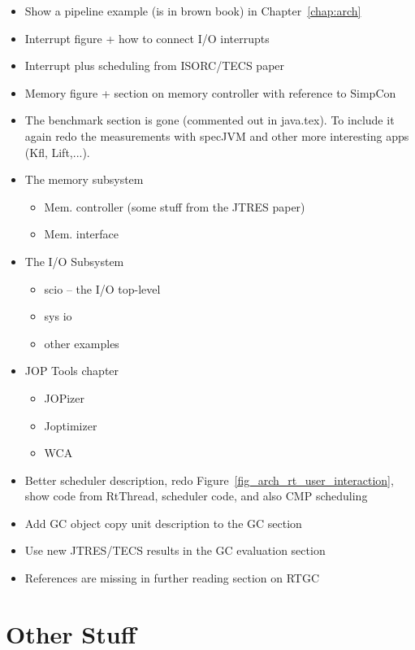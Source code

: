 \begin{itemize}
  \item Show a pipeline example (is in brown book) in
      Chapter~\ref{chap:arch}
  \item Interrupt figure + how to connect I/O interrupts
  \item Interrupt plus scheduling from ISORC/TECS paper
  \item Memory figure + section on memory controller with
      reference to SimpCon
  \item The benchmark section is gone (commented out in
      java.tex). To include it again redo the measurements with
      specJVM and other more interesting apps (Kfl, Lift,...).
  \item The memory subsystem
  \begin{itemize}
    \item Mem. controller (some stuff from the JTRES paper)
    \item Mem. interface
  \end{itemize}
  \item The I/O Subsystem
  \begin{itemize}
    \item scio -- the I/O top-level
    \item sys io
    \item other examples
  \end{itemize}
  \item JOP Tools chapter
  \begin{itemize}
    \item JOPizer
    \item Joptimizer
    \item WCA
  \end{itemize}
  \item Better scheduler description, redo
      Figure~\ref{fig_arch_rt_user_interaction}, show code from
      RtThread, scheduler code, and also CMP scheduling
  \item Add GC object copy unit description to the GC section
  \item Use new JTRES/TECS results in the GC evaluation section
  \item References are missing in further reading section on RTGC
\end{itemize}

\chapter{Other Stuff}

